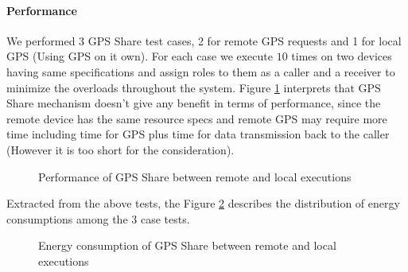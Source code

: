 \documentclass[conference]{IEEEtran}
\begin{document}
\paragraph{Performance}
We performed 3 GPS Share test cases, 2 for remote GPS requests and 1 for local GPS (Using GPS on it own). For each case we execute $10$ times on two devices having same specifications and assign roles to them as a caller and a receiver to minimize the overloads throughout the system. Figure \ref{fig:gps_perf} interprets that GPS Share mechanism doesn't give any benefit in terms of performance, since the remote device has the same resource specs and remote GPS may require more time including time for GPS plus time for data transmission back to the caller (However it is too short for the consideration).

\begin{figure}[H]
	\hspace*{0.7cm}
	\caption{Performance of GPS Share between remote and local executions}
	\label{fig:gps_perf}
\end{figure}

Extracted from the above tests, the Figure \ref{fig:gps_total_energy} describes the distribution of energy consumptions among the 3 case tests. 

\begin{figure}[H]
	\hspace*{0cm}
	\caption{Energy consumption of GPS Share between remote and local executions}
	\label{fig:gps_total_energy}
\end{figure}
\end{document}
